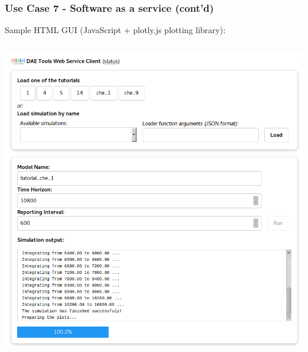 \documentclass[compress,newPxFont,sthlmFooter]{beamer}
\begin{document}
\begin{frame}[plain]
\frametitle{Use Case 7 - Software as a service (cont'd)}
    \small{Sample HTML GUI (JavaScript + plotly.js plotting library):}
    
    \begin{columns}[t]
      \begin{column}{0.45\paperwidth}
        \begin{center}
            \includegraphics[align=c, width=\textwidth]{daetools_ws_html.png}
        \end{center}
      \end{column}


\end{columns}
\end{frame}
\end{document}
